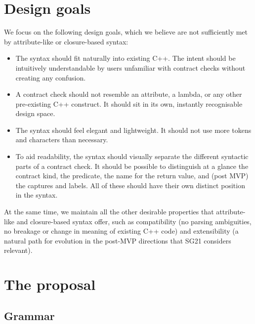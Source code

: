 
\section{Design goals}
\label{sec:design}

We focus on the following design goals, which we believe are not sufficiently met by attribute-like or closure-based syntax:

\begin{itemize}
\item The syntax should fit naturally into existing C++. The intent should be intuitively understandable by users unfamiliar with contract checks without creating any confusion.
\item A contract check should not resemble an attribute, a lambda, or any other pre-existing C++ construct. It should sit in its own, instantly recognisable design space.
\item The syntax should feel elegant and lightweight. It should not use more tokens and characters than necessary.
\item To aid readability, the syntax should visually separate the different syntactic parts of a contract check. It should be possible to distinguish at a glance the contract kind, the predicate, the name for the return value, and (post MVP) the captures and labels. All of these should have their own distinct position in the syntax.
\end{itemize}

 At the same time, we maintain all the other desirable properties that attribute-like and closure-based syntax offer, such as compatibility (no parsing ambiguities, no breakage or change in meaning of existing C++ code) and extensibility (a natural path for evolution in the post-MVP directions that SG21 considers relevant).
 

\section{The proposal}

\subsection{Grammar}
\label{subsec:grammar}

